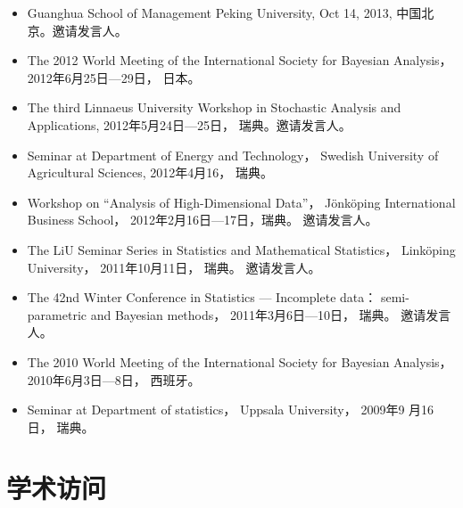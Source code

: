 \documentclass[twoside,a4paper,10pt]{amsart}
\begin{document}
\begin{itemize}
\item Guanghua School of Management Peking University, Oct 14, 2013, 中国北京。邀请发言人。

\item The 2012 World Meeting of the International Society for Bayesian
  Analysis， 2012年6月25日---29日， 日本。

\item The third Linnaeus University Workshop in Stochastic Analysis and
  Applications, 2012年5月24日---25日， 瑞典。邀请发言人。

\item Seminar at Department of Energy and Technology， Swedish
  University of Agricultural Sciences, 2012年4月16， 瑞典。

\item Workshop on ``Analysis of High-Dimensional Data''，
  Jönköping International Business School， 2012年2月16日---17日，瑞典。
  邀请发言人。

\item The LiU Seminar Series in Statistics and Mathematical Statistics，
  Linköping University， 2011年10月11日， 瑞典。 邀请发言人。

\item The 42nd Winter Conference in Statistics --- Incomplete data：
  semi-parametric and Bayesian methods， 2011年3月6日---10日，
  瑞典。 邀请发言人。

\item The 2010 World Meeting of the International Society for Bayesian
  Analysis， 2010年6月3日---8日， 西班牙。

\item Seminar at Department of statistics， Uppsala University， 2009年9
  月16日， 瑞典。

\end{itemize}


\section*{学术访问}
\end{document}
